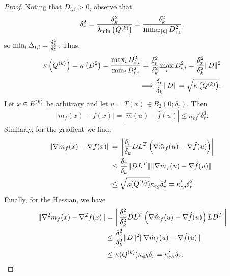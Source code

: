 \begin{proof}
Noting that $D_{i, i} > 0$, observe that
\begin{align*}
\delta_r^2 = \frac {\delta_k^2} {\lambda_{\text{min}}\left({Q^{(k)}}\right)} = \frac {\delta_k^2} {\min_{i \in [n]} D^2_{i, i}},
\end{align*}
so $\min_{i} \Delta_{i, i} = \frac{\delta_k^2}{\delta_r^2}$.
Thus,
\begin{align*}
{\kappa}\left({Q^{(k)}}\right) 
= \kappa\left(D^2\right) 
= \frac{\max_{i}D_{i,i}^2}{\min_{i}D_{i,i}^2} 
= \frac{\delta_r^2}{\delta_k^2} \max_{i}D_{i,i}^2 = \frac{\delta_r^2}{\delta_k^2}\|D\|^2 \\
\Longrightarrow \frac{\delta_r} {\delta_k} \|D\| = \sqrt{{\kappa}\left({Q^{(k)}}\right)}.
\end{align*}
Let $x \in {E^{(k)}}$ be arbitrary and let $u = T(x) \in B_2(0;\delta_r)$.
Then
\begin{align*}
 | m_f(x) - f(x)| = |\hat m(u) - \hat f(u)| \le \kappa_{ef}'\delta_r^3.
\end{align*}
Similarly, for the gradient we find:
\begin{align*}
\| \nabla m_f(x) - \nabla f(x)\| &= \left\|\frac{\delta_r} {\delta_k}DL^T\left(\nabla\hat m_f(u) - \nabla \hat f(u)\right)\right\| \\
& \le \frac{\delta_r} {\delta_k} \|DL^T\|\|\nabla \hat m_f(u) - \nabla \hat f(u)\| \\
& \le \sqrt{{\kappa}({Q^{(k)}})}\kappa_{eg} \delta_r^2 = \kappa_{eg}' \delta_r^2.
\end{align*}
Finally,  for the Hessian, we have
\begin{align*}
\| \nabla^2 m_f(x) - \nabla^2 f(x)\| & = \left\|\frac{\delta_r^2} {\delta_k^2}DL^T\left(\nabla\hat m_f(u) - \nabla \hat f(u)\right)LD^T\right\| \\
& \le \frac{\delta_r^2} {\delta_k^2} \|D\|^2\|\nabla \hat m_f(u) - \nabla \hat f(u)\| \\
& \le {\kappa}({Q^{(k)}})\kappa_{eh} \delta_r = \kappa_{eh}' \delta_r.
\end{align*}

\end{proof}

